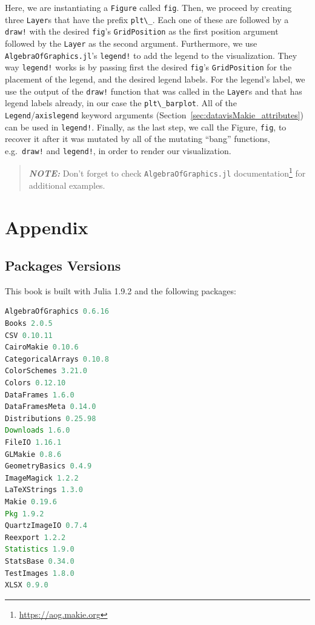 \documentclass[
  notoc %
]{tufte-book}
\DeclareRobustCommand{\href}[2]{#2\footnote{\url{#1}}}
\newcommand{\passthrough}[1]{#1}
\begin{document}
Here, we are instantiating a \passthrough{\lstinline!Figure!} called
\passthrough{\lstinline!fig!}. Then, we proceed by creating three
\passthrough{\lstinline!Layer!}s that have the prefix
\passthrough{\lstinline!plt\_!}. Each one of these are followed by a
\passthrough{\lstinline"draw!"} with the desired
\passthrough{\lstinline!fig!}'s \passthrough{\lstinline!GridPosition!}
as the first position argument followed by the
\passthrough{\lstinline!Layer!} as the second argument. Furthermore, we
use \passthrough{\lstinline!AlgebraOfGraphics.jl!}'s
\passthrough{\lstinline"legend!"} to add the legend to the
visualization. They way \passthrough{\lstinline"legend!"} works is by
passing first the desired \passthrough{\lstinline!fig!}'s
\passthrough{\lstinline!GridPosition!} for the placement of the legend,
and the desired legend labels. For the legend's label, we use the output
of the \passthrough{\lstinline"draw!"} function that was called in the
\passthrough{\lstinline!Layer!}s and that has legend labels already, in
our case the \passthrough{\lstinline!plt\_barplot!}. All of the
\passthrough{\lstinline!Legend!}/\passthrough{\lstinline!axislegend!}
keyword arguments (Section~\ref{sec:datavisMakie_attributes}) can be
used in \passthrough{\lstinline"legend!"}. Finally, as the last step, we
call the Figure, \passthrough{\lstinline!fig!}, to recover it after it
was mutated by all of the mutating ``bang'' functions,
e.g.~\passthrough{\lstinline"draw!"} and
\passthrough{\lstinline"legend!"}, in order to render our visualization.

\begin{quote}
\textbf{\emph{NOTE:}} Don't forget to check
\href{https://aog.makie.org}{\passthrough{\lstinline!AlgebraOfGraphics.jl!}
documentation} for additional examples.
\end{quote}

\hypertarget{sec:appendix}{%
\chapter{Appendix}\label{sec:appendix}}

\hypertarget{sec:appendix_pkg}{%
\section{Packages Versions}\label{sec:appendix_pkg}}

This book is built with Julia 1.9.2 and the following packages:

\begin{lstlisting}[language=Julia]
AlgebraOfGraphics 0.6.16
Books 2.0.5
CSV 0.10.11
CairoMakie 0.10.6
CategoricalArrays 0.10.8
ColorSchemes 3.21.0
Colors 0.12.10
DataFrames 1.6.0
DataFramesMeta 0.14.0
Distributions 0.25.98
Downloads 1.6.0
FileIO 1.16.1
GLMakie 0.8.6
GeometryBasics 0.4.9
ImageMagick 1.2.2
LaTeXStrings 1.3.0
Makie 0.19.6
Pkg 1.9.2
QuartzImageIO 0.7.4
Reexport 1.2.2
Statistics 1.9.0
StatsBase 0.34.0
TestImages 1.8.0
XLSX 0.9.0
\end{lstlisting}
\end{document}
